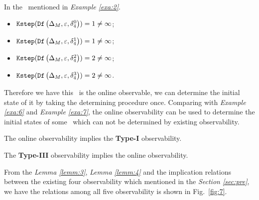 \begin{example}
In the \BCN\ mentioned in {\em Example \ref{exa:2}}.  
 \begin{itemize}
 \item ${\tt Kstep}({\tt Df}\left(\Delta_M,\varepsilon, \delta_{4}^0\right))=1\ne \infty$;
 \item ${\tt Kstep}({\tt Df}\left(\Delta_M,\varepsilon, \delta_{4}^1\right))=1\ne \infty$;
 \item ${\tt Kstep}({\tt Df}\left(\Delta_M,\varepsilon, \delta_{4}^2\right))=2\ne \infty$;
 \item ${\tt Kstep}({\tt Df}\left(\Delta_M,\varepsilon, \delta_{4}^3\right))=2\ne \infty$.
 \end{itemize}
 
Therefore we have this \BCN\ is the online observable, we can determine the initial state of it by taking the determining procedure once. Comparing with {\em Example \ref{exa:6}} and {\em Example \ref{exa:7}}, the online observability can be used to determine the initial states of some \BCNs\ which can not be determined by existing observability. %
\label{exa:10}
\end{example}  

\begin{lemma}
The online observability implies the  {\bf Type-I} observability.
\label{lemm:3}
\end{lemma}


\begin{lemma}
The  {\bf Type-III} observability implies the online observability.
\label{lemm:4}
\end{lemma}

From the {\em Lemma \ref{lemm:3}}, {\em Lemma \ref{lemm:4}}  and the implication relations between the existing four observability which mentioned in the {\em Section \ref{sec:pre}}, we have the relations among all five observability is shown in Fig.~\ref{fig:7}.

